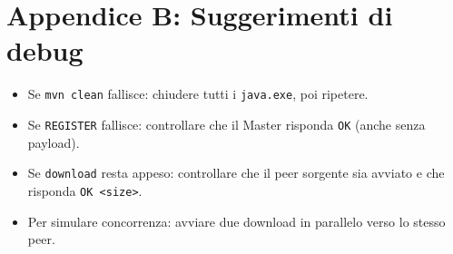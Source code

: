 \documentclass[a4paper,12pt]{article}
\begin{document}
\section{Appendice B: Suggerimenti di debug}
\begin{itemize}[nosep]
  \item Se \texttt{mvn clean} fallisce: chiudere tutti i \texttt{java.exe}, poi ripetere.
  \item Se \texttt{REGISTER} fallisce: controllare che il Master risponda \texttt{OK} (anche senza payload).
  \item Se \texttt{download} resta appeso: controllare che il peer sorgente sia avviato e che risponda \texttt{OK <size>}.
  \item Per simulare concorrenza: avviare due download in parallelo verso lo stesso peer.
\end{itemize}
\end{document}
